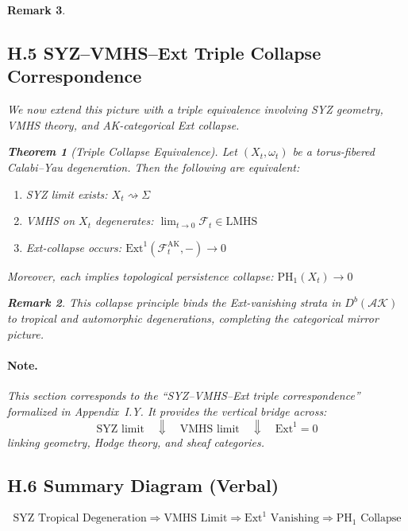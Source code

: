 \documentclass[11pt]{article}
\newtheorem{theorem}{Theorem}[section]
\newtheorem{remark}[theorem]{Remark}
\begin{document}
\begin{remark}

\subsection*{H.5 SYZ–VMHS–Ext Triple Collapse Correspondence}

We now extend this picture with a triple equivalence involving SYZ geometry, VMHS theory, and AK-categorical Ext collapse.

\begin{theorem}[Triple Collapse Equivalence]
Let $(X_t, \omega_t)$ be a torus-fibered Calabi–Yau degeneration. Then the following are equivalent:
\begin{enumerate}
    \item SYZ limit exists: $X_t \rightsquigarrow \Sigma$
    \item VMHS on $X_t$ degenerates: $\lim_{t \to 0} \mathcal{F}_t \in \mathrm{LMHS}$
    \item Ext-collapse occurs: $\mathrm{Ext}^1(\mathcal{F}_t^{\mathrm{AK}}, -) \to 0$
\end{enumerate}
Moreover, each implies topological persistence collapse: $\mathrm{PH}_1(X_t) \to 0$
\end{theorem}

\begin{remark}
This collapse principle binds the Ext-vanishing strata in $D^b(\mathcal{AK})$ to tropical and automorphic degenerations, completing the categorical mirror picture.
\end{remark}

\paragraph{Note.}
This section corresponds to the “SYZ–VMHS–Ext triple correspondence” formalized in Appendix~I.Y. It provides the vertical bridge across:
\[
\text{SYZ limit} \quad \Downarrow \quad \text{VMHS limit} \quad \Downarrow \quad \mathrm{Ext}^1 = 0
\]
linking geometry, Hodge theory, and sheaf categories.

\subsection*{H.6 Summary Diagram (Verbal)}

\[
\text{SYZ Tropical Degeneration}
\Rightarrow
\text{VMHS Limit}
\Rightarrow
\mathrm{Ext}^1 \text{ Vanishing}
\Rightarrow
\mathrm{PH}_1 \text{ Collapse}
\]


\end{remark}
\end{document}

